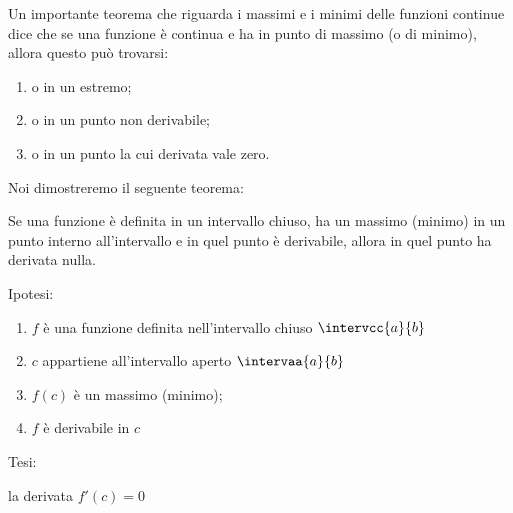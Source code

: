 Un importante teorema che riguarda i massimi e i minimi delle funzioni 
continue dice che se una funzione è continua e ha in punto di massimo (o 
di minimo), allora questo può trovarsi:
\begin{enumerate}[label=\roman*), noitemsep]
 \item o in un estremo;
 \item o in un punto non derivabile;
 \item o in un punto la cui derivata vale zero.
\end{enumerate}

Noi dimostreremo il seguente teorema:
\begin{teorema}
Se una funzione è  
definita in un intervallo chiuso, 
ha un massimo (minimo) in un punto interno all'intervallo
e in quel punto è derivabile, 
allora in quel punto ha derivata nulla.
\end{teorema}

\noindent Ipotesi:
\begin{enumerate}[nosep]
 \item \(f\) è una funzione definita nell'intervallo chiuso \(\intervcc{a}{b}\)
 \item \(c\) appartiene all'intervallo aperto \(\intervaa{a}{b}\)
 \item \(f(c)\) è un massimo (minimo);
 \item \(f\) è derivabile in \(c\)
\end{enumerate}

\noindent Tesi: 

la derivata \(f'(c)=0\)
 
 
